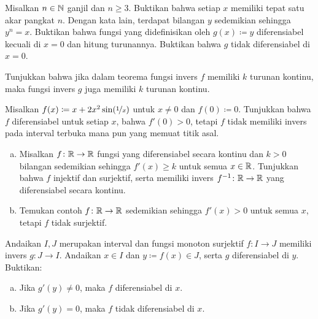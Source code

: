 \begin{exercise} \label{exercise:oddroot}
Misalkan $n \in {\mathbb{N}}$ ganjil dan $n \geq 3$.
Buktikan bahwa setiap $x$ memiliki tepat satu akar pangkat $n$.
Dengan kata lain, terdapat bilangan $y$ sedemikian sehingga $y^n = x$.  Buktikan bahwa
fungsi yang didefinisikan oleh $g(x) \coloneqq y$ diferensiabel kecuali di $x=0$
dan hitung turunannya.  Buktikan bahwa $g$ tidak diferensiabel di $x=0$.
\end{exercise}

\begin{exercise}
Tunjukkan bahwa jika dalam teorema fungsi invers $f$ memiliki $k$ turunan
kontinu, maka fungsi invers $g$ juga memiliki $k$ turunan
kontinu.
\end{exercise}

\begin{exercise}
Misalkan $f(x) \coloneqq x + 2 x^2 \sin(\nicefrac{1}{x})$ untuk $x \neq 0$ dan
$f(0) \coloneqq 0$.  Tunjukkan bahwa $f$ diferensiabel untuk setiap $x$, bahwa $f'(0) > 0$,
tetapi $f$ tidak memiliki invers
pada interval terbuka mana pun yang memuat titik asal.
\end{exercise}

\begin{exercise}
\leavevmode
\begin{enumerate}[a)]
\item
Misalkan $f \colon {\mathbb{R}} \to {\mathbb{R}}$ fungsi yang diferensiabel secara kontinu
dan $k > 0$ bilangan sedemikian sehingga $f'(x) \geq k$ untuk semua $x \in {\mathbb{R}}$.
Tunjukkan bahwa $f$ injektif dan surjektif, serta memiliki invers
$f^{-1} \colon {\mathbb{R}} \to {\mathbb{R}}$ yang diferensiabel secara kontinu.
\item
Temukan contoh $f \colon {\mathbb{R}} \to {\mathbb{R}}$
sedemikian sehingga $f'(x) > 0$
untuk semua $x$, tetapi $f$ tidak surjektif.
\end{enumerate}
\end{exercise}

\begin{exercise}
Andaikan $I,J$ merupakan interval dan fungsi monoton surjektif $f \colon I \to J$ memiliki invers $g \colon J \to I$.
Andaikan $x \in I$ dan $y \coloneqq f(x) \in J$, serta $g$ diferensiabel di
$y$.  Buktikan:
\begin{enumerate}[a)]
\item
Jika $g'(y) \neq 0$, maka $f$ diferensiabel di $x$.
\item
Jika $g'(y) = 0$, maka $f$ tidak diferensiabel di $x$.
\end{enumerate}
\end{exercise}
